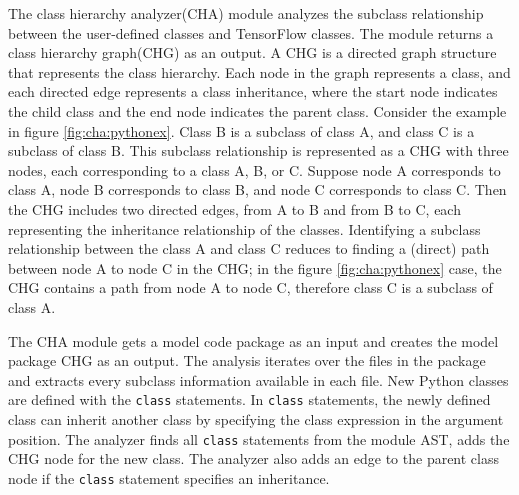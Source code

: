 The class hierarchy analyzer(CHA) module analyzes the
subclass relationship between the 
user-defined classes and TensorFlow classes.
The module returns a class hierarchy graph(CHG) as an output.
A CHG is a directed graph structure that represents the class hierarchy.
Each node in the graph represents a class,
and each directed edge represents a class inheritance,
where the start node indicates the child class
and the end node indicates the parent class.
Consider the example in figure \ref{fig:cha:pythonex}.
Class B is a subclass of class A, and class C is a subclass of 
class B.
This subclass relationship is represented as a CHG with three nodes,
each corresponding to a class A, B, or C.
Suppose node A corresponds to class A, node B corresponds to
class B, and node C corresponds to class C.
Then the CHG includes two directed edges, from A to B and from B to C,
each representing the inheritance relationship of the classes.
Identifying a subclass relationship between the class A and class C
reduces to finding a (direct) path between node A to node C in the CHG;
in the figure \ref{fig:cha:pythonex} case, the CHG contains a
path from node A to node C, therefore class C is a subclass
of class A.


The CHA module gets a model code package as an input
and creates the model package CHG as an output.
The analysis iterates over the files in the package
and extracts every subclass information available in each file.
New Python classes are defined with the {\tt class} statements.
In {\tt class} statements, the newly defined class can
inherit another class by specifying the class expression
in the argument position.
The analyzer finds all {\tt class} statements from the module AST,
adds the CHG node for the new class. The analyzer also adds an edge
to the parent class node if the {\tt class} statement specifies an inheritance.


